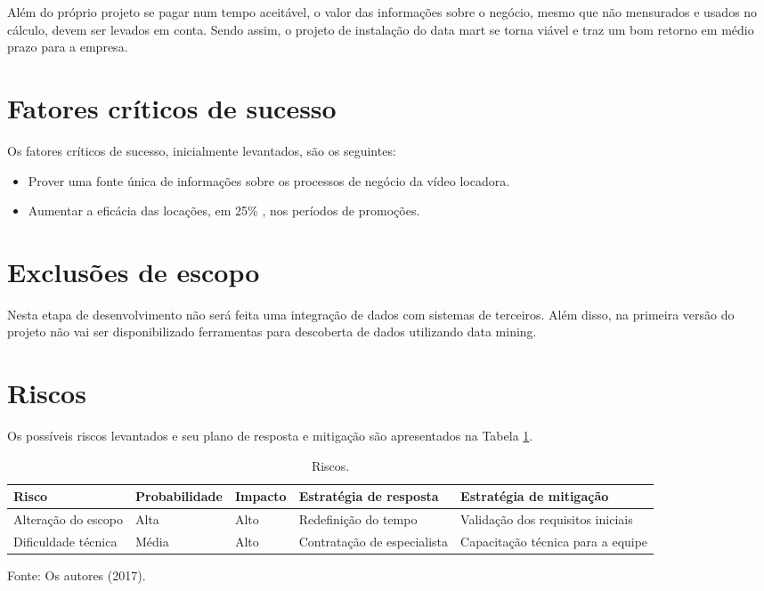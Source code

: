 Além do próprio projeto se pagar num tempo aceitável, 
o valor das informações sobre o negócio, mesmo que 
não mensurados e usados no cálculo, devem ser levados 
em conta. Sendo assim, o projeto de instalação do 
data mart se torna viável e traz um bom retorno 
em médio prazo para a empresa.

\section{Fatores críticos de sucesso}

Os fatores críticos de sucesso, inicialmente 
levantados, são os seguintes:

\begin{itemize}
    \item Prover uma fonte única de informações sobre os processos de negócio da vídeo locadora.
    \item Aumentar a eficácia das locações, em 25\% ,  nos períodos de promoções.
\end{itemize}

\section{Exclusões de escopo}

Nesta etapa de desenvolvimento não será feita uma integração de dados com sistemas de terceiros.  Além disso, na primeira versão do projeto não vai ser disponibilizado ferramentas para descoberta de dados utilizando data mining.


\section{Riscos}

Os possíveis riscos levantados e seu plano de resposta e mitigação são
apresentados na Tabela \ref{tab:riscos}. 

\begin{table}[!htb]
    \begin{center}
        \caption{Riscos.} \label{tab:riscos}
        \begin{tabular}{ p{1.7cm} | p{2cm} | p{1.1cm} | p{2cm} | p{2cm} }
            \hline
            \textbf{Risco} &\textbf{Probabilidade} &\textbf{Impacto} & \textbf{Estratégia de resposta} & \textbf{Estratégia de mitigação} \\
            \hline
            Alteração do
            escopo
             &  Alta  &  Alto  &  Redefinição
             do tempo
               & Validação dos requisitos iniciais  \\
            \hline
            Dificuldade técnica &  Média  &  Alto  &  Contratação de especialista  &  Capacitação técnica para a equipe  \\
            \hline
        \end{tabular}
    \end{center}
    Fonte: Os autores (2017).
\end{table}
 

